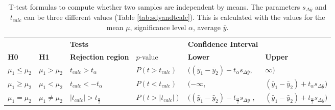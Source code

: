 \documentclass[10pt,a4paper]{article}
\begin{document}
\begin{itemize}
	\begin{table}[h!]
		\centering
		\caption{T-test formulas to compute whether two samples are independent by means. 
			The parameters $s_{\Delta\bar{y}}$ and $t_{calc}$ can be three different 
			values (Table \ref{tab:sdyandtcalc})\cite{heiberger2004statistical}. This is calculated with the values for the mean $\mu$, significance level $\alpha$, average $\bar{y}$.}
		\label{tab:IndepTest}
		\begin{tabular}{llllll}
			\hline
			&  & 
			\multicolumn{2}{l}{\textbf{Tests}} & 
			\textbf{Confidence Interval} & \textbf{}               \\ \cline{3-6} 
			\textbf{H0}              & \textbf{H1}              & \textbf{Rejection 
				region}   & $p$-value                      & 
			\textbf{Lower}               & \textbf{Upper}          \\ \hline
			$\mu_1 \leq \mu_2$                  & $\mu_1 > \mu_2$       & 
			$t_{calc} 
			> t_\alpha$       & $P(t > t_{calc})$      & 
			$((\bar{y}_1 
			- \bar{y}_2) - t_\alpha s_{\Delta \bar{y}}$,       & 
			$\infty)$                     \\
			$\mu_1 \geq \mu_2$                  & $\mu_1 < \mu_2$          & 
			$t_{calc} 
			< -t_\alpha$          & $P(t < t_{calc})$         & 
			$(-\infty$,                        & $(\bar{y}_1 - \bar{y}_2) + 
			t_\alpha 
			s_{\Delta \bar{y}})$ \\
			$\mu_1 = \mu_2$                  & $\mu_1 \neq \mu_2$                  
			& 
			$|t_{calc}| > t_{\frac{\alpha}{2}}$     & $P(t >
			|t_{calc}|)$  & $((\bar{y}_1 - \bar{y}_2) - 
			t_{\frac{\alpha}{2}} 
			s_{\Delta\bar{y}}$ 
			,     & $(\bar{y}_1 - \bar{y}_2) + t_{\frac{\alpha}{2}} 
			s_{\Delta 
				\bar{y}})$  
			\\ 
			\hline
		\end{tabular}
	\end{table}
	

\end{itemize}
\end{document}
